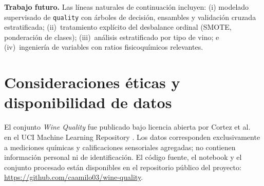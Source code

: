 \documentclass[conference]{IEEEtran}
\begin{document}
\textbf{Trabajo futuro.} Las líneas naturales de continuación incluyen: (i)
modelado supervisado de \texttt{quality} con árboles de decisión, ensambles y
validación cruzada estratificada; (ii)~tratamiento explícito del desbalance
ordinal (SMOTE, ponderación de clases); (iii)~análisis estratificado por tipo
de vino; e (iv)~ingeniería de variables con ratios fisicoquímicos relevantes.

\section*{Consideraciones éticas y disponibilidad de datos}

El conjunto \textit{Wine Quality} fue publicado bajo licencia abierta por
Cortez et al.\ \cite{cortez2009wine} en el UCI Machine Learning Repository
\cite{uci_repo}. Los datos corresponden exclusivamente a mediciones químicas
y calificaciones sensoriales agregadas; no contienen información personal ni
de identificación. El código fuente, el notebook y el conjunto procesado están
disponibles en el repositorio público del proyecto:
\url{https://github.com/caamilo03/wine-quality}.



\end{document}
